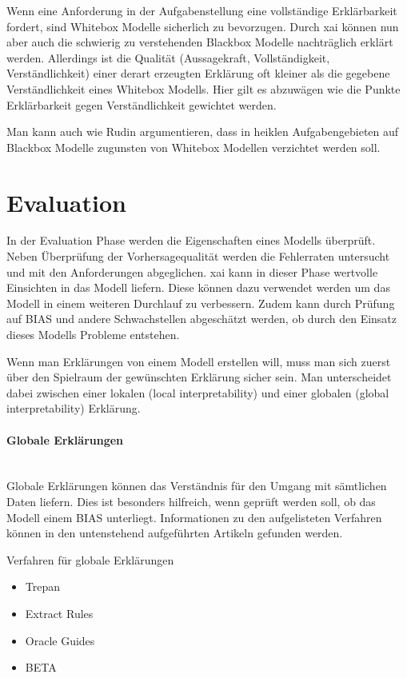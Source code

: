 \documentclass[
  12pt, %
  a4paper, %
  oneside, %
  openany, 
  numbers=noenddot, %
  BCOR=5mm, %
  parskip=half*, %
  thesis, %
]{bfhbook}
\newcommand{\parag}[1]{\paragraph*{#1}\mbox{}\\}
\begin{document}
Wenn eine Anforderung in der Aufgabenstellung eine vollständige Erklärbarkeit fordert, sind Whitebox Modelle sicherlich zu bevorzugen. Durch \Gls{xai} können nun aber auch die schwierig zu verstehenden Blackbox Modelle nachträglich erklärt werden. Allerdings ist die Qualität (Aussagekraft, Vollständigkeit, Verständlichkeit) einer derart erzeugten Erklärung oft kleiner als die gegebene Verständlichkeit eines Whitebox Modells. Hier gilt es abzuwägen wie die Punkte Erklärbarkeit gegen Verständlichkeit gewichtet werden. 

Man kann auch wie Rudin \parencite{Rudin2018} argumentieren, dass in heiklen Aufgabengebieten auf Blackbox Modelle zugunsten von Whitebox Modellen verzichtet werden soll.

\section{Evaluation}
In der Evaluation Phase werden die Eigenschaften eines Modells überprüft. Neben Überprüfung der Vorhersagequalität werden die Fehlerraten untersucht und mit den Anforderungen abgeglichen. \Gls{xai} kann in dieser Phase wertvolle Einsichten in das Modell liefern. Diese können dazu verwendet werden um das Modell in einem weiteren Durchlauf zu verbessern. Zudem kann durch Prüfung auf \Gls{BIAS} und andere Schwachstellen abgeschätzt werden, ob durch den Einsatz dieses Modells Probleme entstehen.

Wenn man Erklärungen von einem Modell erstellen will, muss man sich zuerst über den Spielraum der gewünschten Erklärung sicher sein. Man unterscheidet dabei zwischen einer lokalen (local interpretability) und einer globalen (global interpretability) Erklärung.

\parag{Globale Erklärungen}
Globale Erklärungen können das Verständnis für den Umgang mit sämtlichen Daten liefern. Dies ist besonders hilfreich, wenn geprüft werden soll, ob das Modell einem \Gls{BIAS} unterliegt. Informationen zu den aufgelisteten Verfahren können in den untenstehend aufgeführten Artikeln gefunden werden.

Verfahren für globale Erklärungen
\begin{itemize}
	\item Trepan \parencite{10.5555/2998828.2998832}
	\item Extract Rules \parencite{Craven1994}
	\item Oracle Guides \parencite{Johansson2009}
	\item BETA \parencite{Lakkaraju2017}
\end{itemize}
\end{document}
